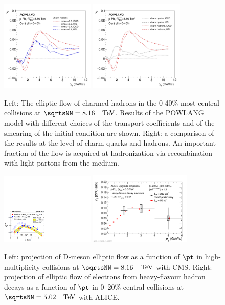 \begin{figure}[ht]
\centering
\includegraphics[width=0.4\textwidth]{hf/figures/v2cD_pPb8TeV_smear.pdf}
\includegraphics[width=0.4\textwidth]{hf/figures/v2cD_pPb8TeV_HTLvslQCD.pdf}
\caption{
Left: The elliptic flow of charmed hadrons in the 0-40\% most central \pPb collisions at $\sqrtsNN=8.16$~$~\text{TeV}$. Results of the POWLANG model with different choices of the transport coefficients and of the smearing of the initial condition are shown. 
Right: a comparison of the results at the level of charm quarks and hadrons. An important fraction of the flow is acquired at hadronization via recombination with light partons from the medium.}
\label{fig:POWLANG-small2}
\end{figure}
\begin{figure}[ht]
\centering
\includegraphics[width=0.4\textwidth]{hf/figures/CMS_Dv2.pdf}
\includegraphics[width=0.43\textwidth]{hf/figures/2017-Oct-30-HFev2Plot.pdf}
\caption{
Left: projection of D-meson elliptic flow as a function of $\pt$ in high-multiplicity \pPb collisions at $\sqrtsNN=8.16$~$~\text{TeV}$ with CMS.
Right: projection of elliptic flow of electrons from heavy-flavour hadron decays as a function of $\pt$ in 0--20\% central \pPb collisions at $\sqrtsNN=5.02$~$~\text{TeV}$ with ALICE.}
\label{fig:elliptic-data}
\end{figure}
